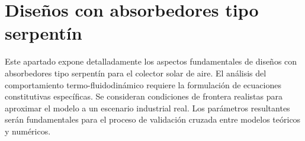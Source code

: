 \section{Diseños con absorbedores tipo serpentín}
\label{sec:cap03_disenos_serpentin}

Este apartado expone detalladamente los aspectos fundamentales de diseños con absorbedores tipo serpentín para el colector solar de aire.
El análisis del comportamiento termo-fluidodinámico requiere la formulación de ecuaciones constitutivas específicas.
Se consideran condiciones de frontera realistas para aproximar el modelo a un escenario industrial real.
Los parámetros resultantes serán fundamentales para el proceso de validación cruzada entre modelos teóricos y numéricos.
